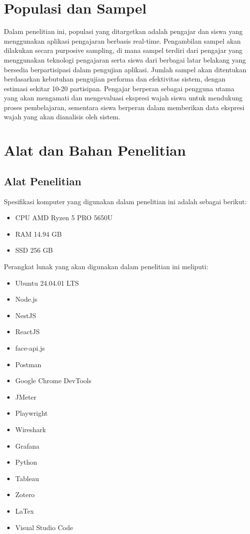 \section{Populasi dan Sampel}
Dalam penelitian ini, populasi yang ditargetkan adalah pengajar dan siswa yang menggunakan aplikasi pengajaran berbasis real-time.
Pengambilan sampel akan dilakukan secara purposive sampling, di mana sampel terdiri dari pengajar yang menggunakan teknologi pengajaran serta siswa dari berbagai latar belakang yang bersedia berpartisipasi dalam pengujian aplikasi.
Jumlah sampel akan ditentukan berdasarkan kebutuhan pengujian performa dan efektivitas sistem, dengan estimasi sekitar 10-20 partisipan.
Pengajar berperan sebagai pengguna utama yang akan mengamati dan mengevaluasi ekspresi wajah siswa untuk mendukung proses pembelajaran, sementara siswa berperan dalam memberikan data ekspresi wajah yang akan dianalisis oleh sistem.

\section{Alat dan Bahan Penelitian}
\subsection{Alat Penelitian}
Spesifikasi komputer yang digunakan dalam penelitian ini adalah sebagai berikut:
\begin{itemize}
  \item CPU AMD Ryzen 5 PRO 5650U
  \item RAM 14.94 GB
  \item SSD 256 GB
\end{itemize}

\hspace{-32pt} Perangkat lunak yang akan digunakan dalam penelitian ini meliputi:
\begin{itemize}
  \item Ubuntu 24.04.01 LTS
  \item Node.js
  \item NestJS
  \item ReactJS
  \item face-api.js
  \item Postman
  \item Google Chrome DevTools
  \item JMeter
  \item Playwright
  \item Wireshark
  \item Grafana
  \item Python
  \item Tableau
  \item Zotero
  \item LaTex
  \item Visual Studio Code
\end{itemize}

